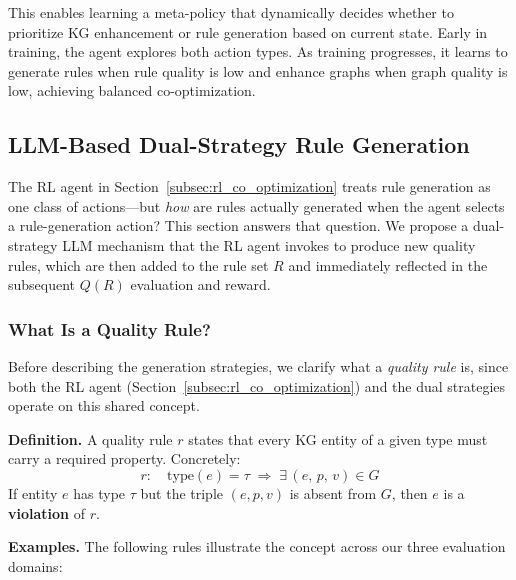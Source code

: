 \documentclass[runningheads]{llncs}
\begin{document}
This enables learning a meta-policy that dynamically decides whether to prioritize KG enhancement or rule generation based on current state. Early in training, the agent explores both action types. As training progresses, it learns to generate rules when rule quality is low and enhance graphs when graph quality is low, achieving balanced co-optimization.

\subsection{LLM-Based Dual-Strategy Rule Generation}
\label{subsec:llm_rule}

The RL agent in Section~\ref{subsec:rl_co_optimization} treats rule generation as one class of actions—but \emph{how} are rules actually generated when the agent selects a rule-generation action? This section answers that question. We propose a dual-strategy LLM mechanism that the RL agent invokes to produce new quality rules, which are then added to the rule set $R$ and immediately reflected in the subsequent $Q(R)$ evaluation and reward.

\subsubsection{What Is a Quality Rule?}
\label{subsubsec:rule_def}

Before describing the generation strategies, we clarify what a \textit{quality rule} is,
since both the RL agent (Section~\ref{subsec:rl_co_optimization}) and the dual strategies operate on this shared concept.

\textbf{Definition.} A quality rule $r$ states that every KG entity of a given type must carry a
required property. Concretely:
\begin{equation}
    r: \quad \mathrm{type}(e) = \tau \;\Longrightarrow\; \exists\,(e,\, p,\, v) \in G
    \label{eq:rule_def}
\end{equation}
If entity $e$ has type $\tau$ but the triple $(e, p, v)$ is absent from $G$, then $e$ is a \textbf{violation} of $r$.

\textbf{Examples.} The following rules illustrate the concept across our three evaluation domains:
\end{document}
